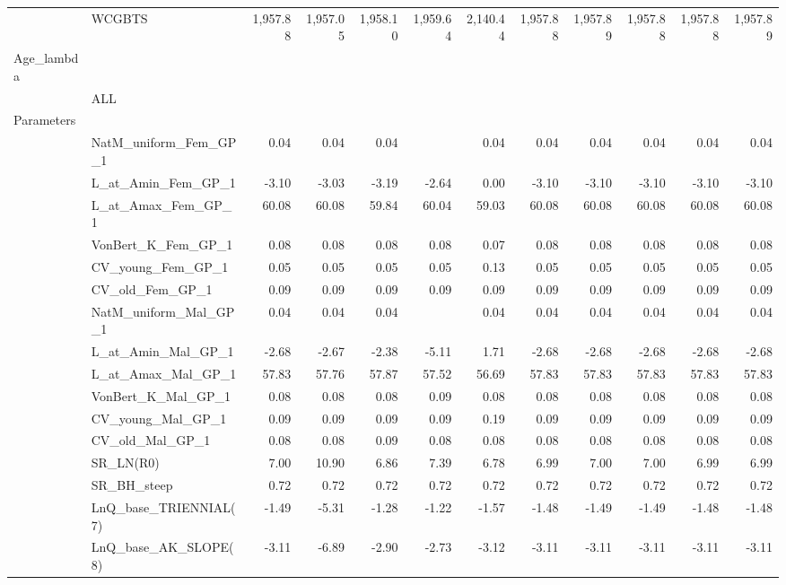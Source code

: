 \documentclass[
]{scrartcl}
\begin{document}
\begin{landscape}
\begin{longtable}{llrrrrrrrrrr}
 & WCGBTS & 1,957.88 & 1,957.05 & 1,958.10 & 1,959.64 & 2,140.44 & 1,957.88 & 1,957.89 & 1,957.88 & 1,957.88 & 1,957.89 \\ 
Age\_lambda &  &  &  &  &  &  &  &  &  &  &  \\ 
 & ALL &  &  &  &  &  &  &  &  &  &  \\ 
Parameters &  &  &  &  &  &  &  &  &  &  &  \\ 
 & NatM\_uniform\_Fem\_GP\_1 & 0.04 & 0.04 & 0.04 &  & 0.04 & 0.04 & 0.04 & 0.04 & 0.04 & 0.04 \\ 
 & L\_at\_Amin\_Fem\_GP\_1 & -3.10 & -3.03 & -3.19 & -2.64 & 0.00 & -3.10 & -3.10 & -3.10 & -3.10 & -3.10 \\ 
 & L\_at\_Amax\_Fem\_GP\_1 & 60.08 & 60.08 & 59.84 & 60.04 & 59.03 & 60.08 & 60.08 & 60.08 & 60.08 & 60.08 \\ 
 & VonBert\_K\_Fem\_GP\_1 & 0.08 & 0.08 & 0.08 & 0.08 & 0.07 & 0.08 & 0.08 & 0.08 & 0.08 & 0.08 \\ 
 & CV\_young\_Fem\_GP\_1 & 0.05 & 0.05 & 0.05 & 0.05 & 0.13 & 0.05 & 0.05 & 0.05 & 0.05 & 0.05 \\ 
 & CV\_old\_Fem\_GP\_1 & 0.09 & 0.09 & 0.09 & 0.09 & 0.09 & 0.09 & 0.09 & 0.09 & 0.09 & 0.09 \\ 
 & NatM\_uniform\_Mal\_GP\_1 & 0.04 & 0.04 & 0.04 &  & 0.04 & 0.04 & 0.04 & 0.04 & 0.04 & 0.04 \\ 
 & L\_at\_Amin\_Mal\_GP\_1 & -2.68 & -2.67 & -2.38 & -5.11 & 1.71 & -2.68 & -2.68 & -2.68 & -2.68 & -2.68 \\ 
 & L\_at\_Amax\_Mal\_GP\_1 & 57.83 & 57.76 & 57.87 & 57.52 & 56.69 & 57.83 & 57.83 & 57.83 & 57.83 & 57.83 \\ 
 & VonBert\_K\_Mal\_GP\_1 & 0.08 & 0.08 & 0.08 & 0.09 & 0.08 & 0.08 & 0.08 & 0.08 & 0.08 & 0.08 \\ 
 & CV\_young\_Mal\_GP\_1 & 0.09 & 0.09 & 0.09 & 0.09 & 0.19 & 0.09 & 0.09 & 0.09 & 0.09 & 0.09 \\ 
 & CV\_old\_Mal\_GP\_1 & 0.08 & 0.08 & 0.09 & 0.08 & 0.08 & 0.08 & 0.08 & 0.08 & 0.08 & 0.08 \\ 
 & SR\_LN(R0) & 7.00 & 10.90 & 6.86 & 7.39 & 6.78 & 6.99 & 7.00 & 7.00 & 6.99 & 6.99 \\ 
 & SR\_BH\_steep & 0.72 & 0.72 & 0.72 & 0.72 & 0.72 & 0.72 & 0.72 & 0.72 & 0.72 & 0.72 \\ 
 & LnQ\_base\_TRIENNIAL(7) & -1.49 & -5.31 & -1.28 & -1.22 & -1.57 & -1.48 & -1.49 & -1.49 & -1.48 & -1.48 \\ 
 & LnQ\_base\_AK\_SLOPE(8) & -3.11 & -6.89 & -2.90 & -2.73 & -3.12 & -3.11 & -3.11 & -3.11 & -3.11 & -3.11 \\ 

\end{longtable}
\end{landscape}
\end{document}
